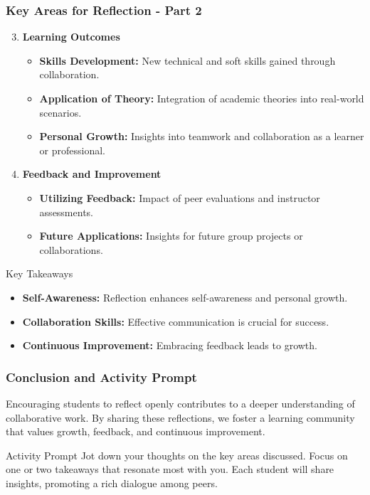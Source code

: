 \documentclass{beamer}
\begin{document}
\begin{frame}[fragile]
    \frametitle{Key Areas for Reflection - Part 2}
    \begin{enumerate}
        \setcounter{enumi}{2} %
        \item \textbf{Learning Outcomes}
        \begin{itemize}
            \item \textbf{Skills Development:} New technical and soft skills gained through collaboration.
            \item \textbf{Application of Theory:} Integration of academic theories into real-world scenarios.
            \item \textbf{Personal Growth:} Insights into teamwork and collaboration as a learner or professional.
        \end{itemize}

        \item \textbf{Feedback and Improvement}
        \begin{itemize}
            \item \textbf{Utilizing Feedback:} Impact of peer evaluations and instructor assessments.
            \item \textbf{Future Applications:} Insights for future group projects or collaborations.
        \end{itemize}
    \end{enumerate}

    \begin{block}{Key Takeaways}
        \begin{itemize}
            \item \textbf{Self-Awareness:} Reflection enhances self-awareness and personal growth.
            \item \textbf{Collaboration Skills:} Effective communication is crucial for success.
            \item \textbf{Continuous Improvement:} Embracing feedback leads to growth.
        \end{itemize}
    \end{block}
\end{frame}

\begin{frame}[fragile]
    \frametitle{Conclusion and Activity Prompt}
    Encouraging students to reflect openly contributes to a deeper understanding of collaborative work. By sharing these reflections, we foster a learning community that values growth, feedback, and continuous improvement.

    \begin{block}{Activity Prompt}
        Jot down your thoughts on the key areas discussed. Focus on one or two takeaways that resonate most with you. Each student will share insights, promoting a rich dialogue among peers.
    \end{block}
\end{frame}
\end{document}
